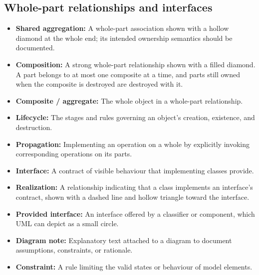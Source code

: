 \documentclass[11pt]{article}
\newenvironment{DottedList}{%
  \begin{itemize}[leftmargin=2em, itemsep=0.35em, topsep=0.35em, label=\textbullet]
}{%
  \end{itemize}
}
\begin{document}
\subsection*{Whole-part relationships and interfaces}
\begin{DottedList}
  \item \textbf{Shared aggregation:} A whole-part association shown with a hollow diamond at the whole end; its intended ownership semantics should be documented.
  \item \textbf{Composition:} A strong whole-part relationship shown with a filled diamond. A part belongs to at most one composite at a time, and parts still owned when the composite is destroyed are destroyed with it.
  \item \textbf{Composite / aggregate:} The whole object in a whole-part relationship.
  \item \textbf{Lifecycle:} The stages and rules governing an object's creation, existence, and destruction.
  \item \textbf{Propagation:} Implementing an operation on a whole by explicitly invoking corresponding operations on its parts.
  \item \textbf{Interface:} A contract of visible behaviour that implementing classes provide.
  \item \textbf{Realization:} A relationship indicating that a class implements an interface's contract, shown with a dashed line and hollow triangle toward the interface.
  \item \textbf{Provided interface:} An interface offered by a classifier or component, which UML can depict as a small circle.
  \item \textbf{Diagram note:} Explanatory text attached to a diagram to document assumptions, constraints, or rationale.
  \item \textbf{Constraint:} A rule limiting the valid states or behaviour of model elements.
\end{DottedList}
\end{document}
